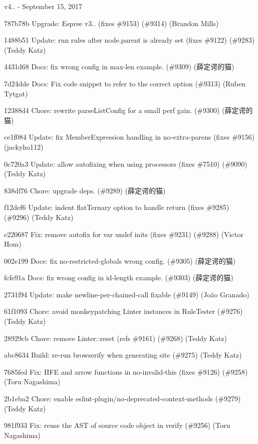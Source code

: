 v4.. -\/ September 15, 2017


\begin{DoxyItemize}
\item 787b78b Upgrade\+: Espree v3.. (fixes \#9153) (\#9314) (Brandon Mills)
\item 1488b51 Update\+: run rules after {\ttfamily node.\+parent} is already set (fixes \#9122) (\#9283) (Teddy Katz)
\item 4431d68 Docs\+: fix wrong config in max-\/len example. (\#9309) (薛定谔的猫)
\item 7d24dde Docs\+: Fix code snippet to refer to the correct option (\#9313) (Ruben Tytgat)
\item 12388d4  \+Chore\+: rewrite parse\+List\+Config for a small perf gain. (\#9300) (薛定谔的猫)
\item ce1f084 Update\+: fix Member\+Expression handling in no-\/extra-\/parens (fixes \#9156) (jackyho112)
\item 0c720a3 Update\+: allow autofixing when using processors (fixes \#7510) (\#9090) (Teddy Katz)
\item 838df76 Chore\+: upgrade deps. (\#9289) (薛定谔的猫)
\item f12def6 Update\+: indent flat\+Ternary option to handle {\ttfamily return} (fixes \#9285) (\#9296) (Teddy Katz)
\item e220687 Fix\+: remove autofix for var undef inits (fixes \#9231) (\#9288) (Victor Hom)
\item 002e199 Docs\+: fix no-\/restricted-\/globals wrong config. (\#9305) (薛定谔的猫)
\item fcfe91a Docs\+: fix wrong config in id-\/length example. (\#9303) (薛定谔的猫)
\item 2731f94 Update\+: make newline-\/per-\/chained-\/call fixable (\#9149) (João Granado)
\item 61f1093 Chore\+: avoid monkeypatching Linter instances in Rule\+Tester (\#9276) (Teddy Katz)
\item 28929cb Chore\+: remove Linter\+::reset (refs \#9161) (\#9268) (Teddy Katz)
\item abc8634 Build\+: re-\/run browserify when generating site (\#9275) (Teddy Katz)
\item 7685fed Fix\+: IIFE and arrow functions in no-\/invalid-\/this (fixes \#9126) (\#9258) (Toru Nagashima)
\item 2b1eba2 Chore\+: enable eslint-\/plugin/no-\/deprecated-\/context-\/methods (\#9279) (Teddy Katz)
\item 981f933 Fix\+: reuse the AST of source code object in verify (\#9256) (Toru Nagashima)

\end{DoxyItemize}
